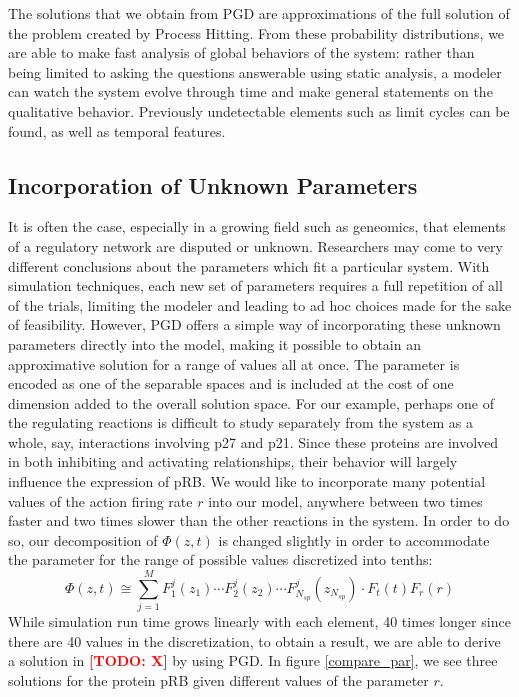 \documentclass{article}
\newcommand{\lighttodo}[1]{\textcolor{red}{#1}}
\newcommand{\todo}[1]{\lighttodo{\textbf{[TODO: #1]}}}
\begin{document}
The solutions that we obtain from PGD are approximations of the full solution of the problem created by Process Hitting. From these probability distributions, we are able to make fast analysis of global behaviors of the system: rather than being limited to asking the questions answerable using static analysis, a modeler can watch the system evolve through time and make general statements on the qualitative behavior. Previously undetectable elements such as limit cycles can be found, as well as temporal features.

\subsection{Incorporation of Unknown Parameters}\label{parameter}
It is often the case, especially in a growing field such as geneomics, that elements of a regulatory network are disputed or unknown. Researchers may come to very different conclusions about the parameters which fit a particular system. With simulation techniques, each new set of parameters requires a full repetition of all of the trials, limiting the modeler and leading to ad hoc choices made for the sake of feasibility. However, PGD offers a simple way of incorporating these unknown parameters directly into the model, making it possible to obtain an approximative solution for a range of values all at once\cite{chinesta2010use}. The parameter is encoded as one of the separable spaces and is included at the cost of one dimension added to the overall solution space. For our example, perhaps one of the regulating reactions is difficult to study separately from the system as a whole, say, interactions involving p27 and p21. Since these proteins are involved in both inhibiting and activating relationships, their behavior will largely influence the expression of pRB. We would like to incorporate many potential values of the action firing rate $r$ into our model, anywhere between two times faster and two times slower than the other reactions in the system. In order to do so, our decomposition of $\Phi(z,t)$ is changed slightly in order to accommodate the parameter for the range of possible values discretized into tenths:
\[
 \Phi(z,t)\cong \sum_{j=1}^{M}F_1^j(z_1)\cdots F_2^j(z_2)\cdots F_{N_{sp}}^j(z_{N_{sp}}) \cdot F_t(t)F_r(r)
\]
While simulation run time grows linearly with each element, 40 times longer since there are 40 values in the discretization, to obtain a result, we are able to derive a solution in \todo{X} by using PGD. In figure \ref{compare_par}, we see three solutions for the protein pRB given different values of the parameter $r$.
\end{document}
